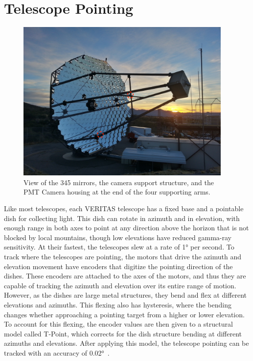 \section{Telescope Pointing}\label{sec:telpoint}

\begin{figure}[ht]
  \centering
  \includegraphics[width=0.95\textwidth]{images/single_telescope}
  \caption[Single Veritas Telescope]{
    View of the 345 mirrors, the camera support structure, and the PMT Camera housing at the end of the four supporting arms.}
  \label{fig:davcottel}
\end{figure}

Like most telescopes, each VERITAS telescope has a fixed base and a pointable dish for collecting light.
This dish can rotate in azimuth and in elevation, with enough range in both axes to point at any direction above the horizon that is not blocked by local mountains, though low elevations have reduced gamma-ray sensitivity.
At their fastest, the telescopes slew at a rate of \nicetilde{}\ang{1} per second.
To track where the telescopes are pointing, the motors that drive the azimuth and elevation movement have encoders that digitize the pointing direction of the dishes.
These encoders are attached to the axes of the motors, and thus they are capable of tracking the azimuth and elevation over its entire range of motion.
However, as the dishes are large metal structures, they bend and flex at different elevations and azimuths.
This flexing also has hysteresis, where the bending changes whether approaching a pointing target from a higher or lower elevation.
To account for this flexing, the encoder values are then given to a structural model called T-Point, which corrects for the dish structure bending at different azimuths and elevations.
After applying this model, the telescope pointing can be tracked with an accuracy of \nicetilde{}\ang{0.02}~\cite{holder2008status}.

